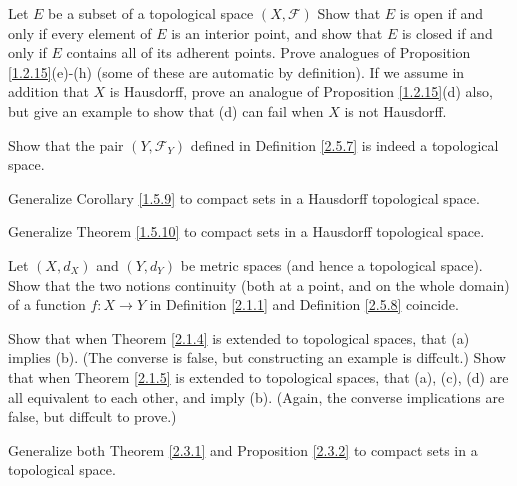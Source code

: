 \begin{exercise}\label{ex 2.5.11}
    Let \(E\) be a subset of a topological space \((X, \mathcal{F})\)
    Show that \(E\) is open if and only if every element of \(E\) is an interior point, and show that \(E\) is closed if and only if \(E\) contains all of its adherent points.
    Prove analogues of Proposition \ref{1.2.15}(e)-(h) (some of these are automatic by definition).
    If we assume in addition that \(X\) is Hausdorff, prove an analogue of Proposition \ref{1.2.15}(d) also, but give an example to show that (d) can fail when \(X\) is not Hausdorff.
\end{exercise}

\begin{exercise}\label{ex 2.5.12}
    Show that the pair \((Y, \mathcal{F}_Y)\) defined in Definition \ref{2.5.7} is indeed a topological space.
\end{exercise}

\begin{exercise}\label{ex 2.5.13}
    Generalize Corollary \ref{1.5.9} to compact sets in a Hausdorff topological space.
\end{exercise}

\begin{exercise}\label{ex 2.5.14}
    Generalize Theorem \ref{1.5.10} to compact sets in a Hausdorff topological space.
\end{exercise}

\begin{exercise}\label{ex 2.5.15}
    Let \((X, d_X)\) and \((Y, d_Y)\) be metric spaces (and hence a topological space).
    Show that the two notions continuity (both at a point, and on the whole domain) of a function \(f : X \to Y\) in Definition \ref{2.1.1} and Definition \ref{2.5.8} coincide.
\end{exercise}

\begin{exercise}\label{ex 2.5.16}
    Show that when Theorem \ref{2.1.4} is extended to topological spaces, that (a) implies (b).
    (The converse is false, but constructing an example is diffcult.)
    Show that when Theorem \ref{2.1.5} is extended to topological spaces, that (a), (c), (d) are all equivalent to each other, and imply (b).
    (Again, the converse implications are false, but diffcult to prove.)
\end{exercise}

\begin{exercise}\label{ex 2.5.17}
    Generalize both Theorem \ref{2.3.1} and Proposition \ref{2.3.2} to compact sets in a topological space.
\end{exercise}